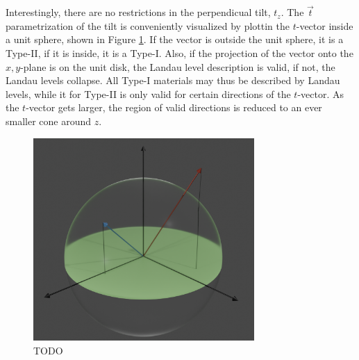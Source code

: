 Interestingly, there are no restrictions in the perpendicual tilt, \( t_z \).
The \( \vec{t} \) parametrization of the tilt is conveniently visualized by plottin the \( t \)-vector inside a unit sphere, shown in Figure \ref{fig:tiltSphere}.
If the vector is outside the unit sphere, it is a Type-II, if it is inside, it is a Type-I.
Also, if the projection of the vector onto the \(x,y\)-plane is on the unit disk, the Landau level description is valid, if not, the Landau levels collapse.
All Type-I materials may thus be described by Landau levels, while it for Type-II is only valid for certain directions of the \(t\)-vector.
As the \(t\)-vector gets larger, the region of valid directions is reduced to an ever smaller cone around \(z\).
\begin{figure}[ht]
  \centering
  \includegraphics[width=0.75\textwidth]{figures/tiltSpherewBackground.png}
  \caption{\label{fig:tiltSphere} TODO}
\end{figure}

